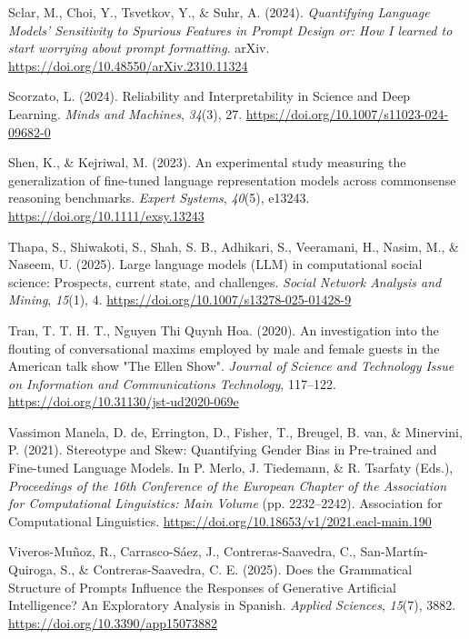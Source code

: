 \documentclass[
  12pt,
]{article}
\newlength{\cslhangindent}
\newenvironment{CSLReferences}[2] %
 {\begin{list}{}{%
  \setlength{\itemindent}{0pt}
  \setlength{\leftmargin}{0pt}
  \setlength{\parsep}{0pt}
  \ifodd #1
   \setlength{\leftmargin}{\cslhangindent}
   \setlength{\itemindent}{-1\cslhangindent}
  \fi
  \setlength{\itemsep}{#2\baselineskip}}}
 {\end{list}}
\begin{document}
\begin{CSLReferences}{1}{0}
Sclar, M., Choi, Y., Tsvetkov, Y., \& Suhr, A. (2024). \emph{Quantifying {Language} {Models}' {Sensitivity} to {Spurious} {Features} in {Prompt} {Design} or: {How} {I} learned to start worrying about prompt formatting}. arXiv. \url{https://doi.org/10.48550/arXiv.2310.11324}

Scorzato, L. (2024). Reliability and {Interpretability} in {Science} and {Deep} {Learning}. \emph{Minds and Machines}, \emph{34}(3), 27. \url{https://doi.org/10.1007/s11023-024-09682-0}

Shen, K., \& Kejriwal, M. (2023). An experimental study measuring the generalization of fine-tuned language representation models across commonsense reasoning benchmarks. \emph{Expert Systems}, \emph{40}(5), e13243. \url{https://doi.org/10.1111/exsy.13243}

Thapa, S., Shiwakoti, S., Shah, S. B., Adhikari, S., Veeramani, H., Nasim, M., \& Naseem, U. (2025). Large language models ({LLM}) in computational social science: Prospects, current state, and challenges. \emph{Social Network Analysis and Mining}, \emph{15}(1), 4. \url{https://doi.org/10.1007/s13278-025-01428-9}

Tran, T. T. H. T., Nguyen Thi Quynh Hoa. (2020). An investigation into the flouting of conversational maxims employed by male and female guests in the {American} talk show "{The} {Ellen} {Show}". \emph{Journal of Science and Technology Issue on Information and Communications Technology}, 117--122. \url{https://doi.org/10.31130/jst-ud2020-069e}

Vassimon Manela, D. de, Errington, D., Fisher, T., Breugel, B. van, \& Minervini, P. (2021). Stereotype and {Skew}: {Quantifying} {Gender} {Bias} in {Pre}-trained and {Fine}-tuned {Language} {Models}. In P. Merlo, J. Tiedemann, \& R. Tsarfaty (Eds.), \emph{Proceedings of the 16th {Conference} of the {European} {Chapter} of the {Association} for {Computational} {Linguistics}: {Main} {Volume}} (pp. 2232--2242). Association for Computational Linguistics. \url{https://doi.org/10.18653/v1/2021.eacl-main.190}

Viveros-Muñoz, R., Carrasco-Sáez, J., Contreras-Saavedra, C., San-Martín-Quiroga, S., \& Contreras-Saavedra, C. E. (2025). Does the {Grammatical} {Structure} of {Prompts} {Influence} the {Responses} of {Generative} {Artificial} {Intelligence}? {An} {Exploratory} {Analysis} in {Spanish}. \emph{Applied Sciences}, \emph{15}(7), 3882. \url{https://doi.org/10.3390/app15073882}


\end{CSLReferences}
\end{document}
